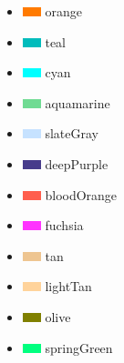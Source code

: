 \documentclass[10pt]{article}
\begin{document}
\begin{itemize}
    \item \includegraphics{images/colors/orange.png} orange
    \item \includegraphics{images/colors/teal.png} teal
    \item \includegraphics{images/colors/cyan.png} cyan
    \item \includegraphics{images/colors/aquamarine.png} aquamarine
    \item \includegraphics{images/colors/slateGray.png} slateGray
    \item \includegraphics{images/colors/purpleBlue.png} deepPurple
    \item \includegraphics{images/colors/bloodOrange.png} bloodOrange
    \item \includegraphics{images/colors/fuchsia.png} fuchsia
    \item \includegraphics{images/colors/tan.png} tan
    \item \includegraphics{images/colors/lightTan.png} lightTan
    \item \includegraphics{images/colors/olive.png} olive
    \item \includegraphics{images/colors/springGreen.png} springGreen

\end{itemize}
\end{document}
